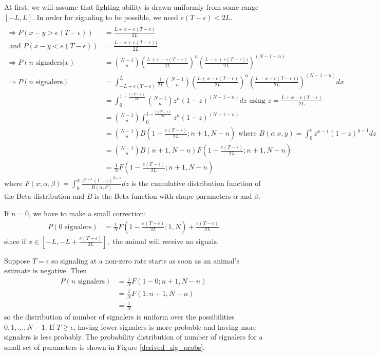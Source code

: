 \documentclass{article}
\begin{document}
At first, we will assume that fighting ability is drawn uniformly from some range $[-L,L]$.  In order for signaling to be possible, we need $e(T-\epsilon)<2L$.
\begin{align*}
\\ \Rightarrow P(x-y>e(T-\epsilon))&=\frac{L+x-e(T-\epsilon)}{2L} \\ \text{ and } P(x-y<e(T-\epsilon))&=\frac{L-x+e(T-\epsilon))}{2L}
\\ \Rightarrow P(n \text{ signalers}|x)&={N-1\choose n}\left(\frac{L+x-e(T-\epsilon)}{2L}\right)^n\left(\frac{L-x+e(T-\epsilon))}{2L}\right)^{(N-1-n)}
\\ \Rightarrow P(n \text{ signalers})&=\int_{-L+e(T-\epsilon)}^L\frac{1}{2L}{N-1\choose n}\left(\frac{L+x-e(T-\epsilon)}{2L}\right)^n\left(\frac{L-x+e(T-\epsilon))}{2L}\right)^{(N-1-n)}dx
\\ &=\int_0^{1-\frac{e(T-\epsilon)}{2L}}{N-1\choose n}z^n(1-z)^{(N-1-n)}dz \text{ using $z=\frac{L+x-e(T-\epsilon)}{2L}$}
\\ &={N-1\choose n}\int_0^{1-\frac{e(T-\epsilon)}{2L}}z^n(1-z)^{(N-1-n)}
\\ &={N-1 \choose n} B\left(1-\frac{e(T-\epsilon)}{2L};n+1,N-n\right) \text{ where $B(c;x,y)=\int_0^cz^{x-1}(1-z)^{y-1}dz$}  
\\&={N-1\choose n}B(n+1,N-n)F\left(1-\frac{e(T-\epsilon)}{2L};n+1,N-n\right)
\\&=\frac{1}{N}F\left(1-\frac{e(T-\epsilon)}{2L};n+1,N-n\right) \tag{$\star$} \label{STAR}
\end{align*} 
where $F(x;\alpha,\beta)=\int_0^x\frac{z^{\alpha-1}(1-z)^{\beta-1}}{B(\alpha,\beta)}dz$ is the cumulative distribution function of the Beta distribution and $B$ is the Beta function with shape parameters $\alpha$ and $\beta$.

If $n=0$, we have to make a small correction:
\begin{align*}
P(0 \text{ signalers})&=\frac{1}{N}F\left(1-\frac{e(T-\epsilon)}{2L};1,N\right)+\frac{e(T-\epsilon)}{2L}
\end{align*}
since if $x\in [-L,-L+\frac{e(T+\epsilon)}{2L}],$ the animal will receive no signals.

Suppose $T=\epsilon$ so signaling at a non-zero rate starts as soon as an animal's estimate is negative.  Then 
\begin{align*}
P(n \text{ signalers})&=\frac{1}{N}F(1-0;n+1,N-n)
\\&=\frac{1}{N}F(1;n+1,N-n)
\\&=\frac{1}{N}
\end{align*}
so the distribution of number of signalers is uniform over the possibilities $0,1,\dots,N-1$.  If $T\gneq \epsilon$, having fewer signalers is more probable and having more signalers is less probably.  The probability distribution of number of signalers for a small set of parameters is shown in Figure \ref{derived_sig_probs}.
\end{document}
